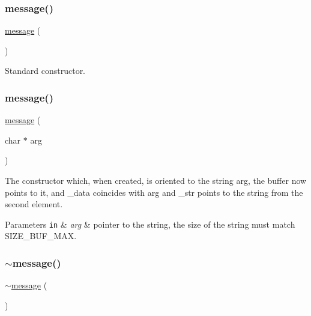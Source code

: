\subsubsection{\texorpdfstring{message()}{message()}\hspace{0.1cm}{\footnotesize\ttfamily [1/2]}}
{\footnotesize\ttfamily \hyperlink{classmessage}{message} (\begin{DoxyParamCaption}{ }\end{DoxyParamCaption})}



Standard constructor. 

\mbox{\label{classmessage_a3ef1da0ca306b53a28c36153a06b0f7d}} 
\subsubsection{\texorpdfstring{message()}{message()}\hspace{0.1cm}{\footnotesize\ttfamily [2/2]}}
{\footnotesize\ttfamily \hyperlink{classmessage}{message} (\begin{DoxyParamCaption}\item[{char $\ast$}]{arg }\end{DoxyParamCaption})}



The constructor which, when created, is oriented to the string arg, the buffer now points to it, and \+\_\+data coincides with arg and \+\_\+str points to the string from the second element. 


\begin{DoxyParams}[1]{Parameters}
\mbox{\tt in}  & {\em arg} & pointer to the string, the size of the string must match S\+I\+Z\+E\+\_\+\+B\+U\+F\+\_\+\+M\+AX. \\
\hline
\end{DoxyParams}
\mbox{\label{classmessage_ad1e1d5c1974b1842edde5b261015cdde}} 
\subsubsection{\texorpdfstring{$\sim$message()}{~message()}}
{\footnotesize\ttfamily $\sim$\hyperlink{classmessage}{message} (\begin{DoxyParamCaption}{ }\end{DoxyParamCaption})}



